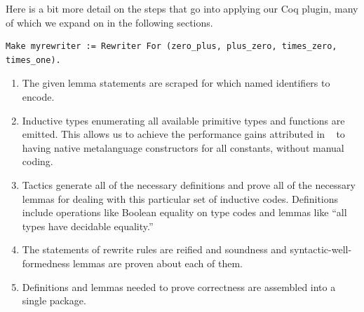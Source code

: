 \documentclass[sn-mathphys,pdflatex]{sn-jnl}%
\newcommand{\citetfield}[1]{\usebibentry{#1}{citet}~\cite{#1}}
\theoremstyle{thmstyleone}%
\theoremstyle{thmstyletwo}%
\theoremstyle{thmstylethree}%
\begin{document}
Here is a bit more detail on the steps that go into applying our Coq plugin, many of which we expand on in the following sections.
\begin{verbatim}
Make myrewriter := Rewriter For (zero_plus, plus_zero, times_zero, times_one).
\end{verbatim}
\begin{enumerate}
\item
  The given lemma statements are scraped for which named identifiers to encode.
\item
  Inductive types enumerating all available primitive types and functions are emitted.
  This allows us to achieve the performance gains attributed in \citetfield{Boespflug2009} to having native metalanguage constructors for all constants, without manual coding.
\item
  Tactics generate all of the necessary definitions and prove all of the necessary lemmas for dealing with this particular set of inductive codes.
  Definitions include operations like Boolean equality on type codes and lemmas like ``all types have decidable equality.''
\item
  The statements of rewrite rules are reified and soundness and syntactic-well-formedness lemmas are proven about each of them.
\item
  Definitions and lemmas needed to prove correctness are assembled into a single package.
\end{enumerate}
\end{document}
